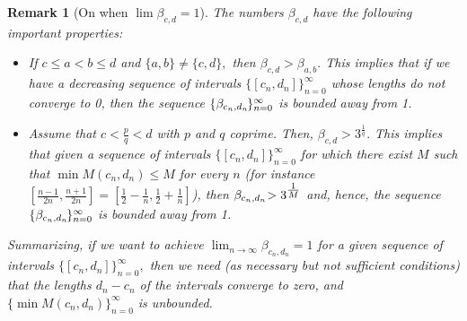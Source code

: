 \documentclass[a4paper, 11pt]{amsart}
\numberwithin{equation}{section}
\theoremstyle{customnumberedtheorem}
\theoremstyle{definitionwithbfnote}
\newtheorem{remark}[theorem]{Remark}
\begin{document}
\begin{remark}[On when \boldmath$\lim\beta_{c,d} = 1$]\label{PropsGoingZero}
The numbers $\beta_{c,d}$ have the following important properties:
\begin{itemize}
 \item If $c \le a < b \le d$ and $\{a,b\} \ne \{c,d\},$ then
       $\beta_{c,d} > \beta_{a,b}.$
       This implies that if we have a decreasing sequence of intervals
       $\{[c_n,d_n]\}_{n=0}^\infty$ whose lengths do not converge to 0,
       then the sequence $\{\beta_{c_n,d_n}\mkern-2mu\}_{n=0}^\infty$
       is bounded away from 1.
 \item Assume that $c < \tfrac{p}{q} < d$ with $p$ and $q$ coprime.
       Then, $\beta_{c,d} > 3^{\tfrac{1}{q}}.$
       This implies that given a sequence of intervals
       $\{[c_n,d_n]\}_{n=0}^\infty$ for which there exist $M$ such that
       $\min M(c_n, d_n) \le M$ for every $n$
       (for instance
        $
          \left[\tfrac{n-1}{2n}, \tfrac{n+1}{2n}\right] =
          \left[\tfrac{1}{2}-\tfrac{1}{n}, \tfrac{1}{2}+\tfrac{1}{n}\right]
        $),
       then $\beta_{c_n,d_n}\mkern-4mu > 3^{\tfrac{1}{M}}$ and, hence,
       the sequence $\{\beta_{c_n,d_n}\mkern-2mu\}_{n=0}^\infty$
       is bounded away from 1.
\end{itemize}
Summarizing, if we want to achieve
$\lim_{n\to\infty} \beta_{c_n,d_n} = 1$
for a given sequence of intervals $\{[c_n,d_n]\}_{n=0}^\infty,$
then we need (as necessary but not sufficient conditions)
that the lengths $d_n-c_n$ of the intervals converge to zero,
and $\{\min M(c_n, d_n)\}_{n=0}^\infty$ is unbounded.
\end{remark}
\end{document}
